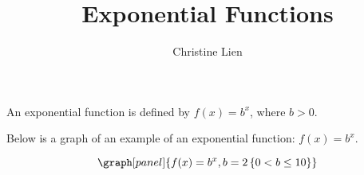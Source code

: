 \documentclass{ximera}
\title{Exponential Functions}
\author{Christine Lien}
\begin{document}


\begin{definition}
An exponential function is defined by $f(x)=b^x$, where $b>0$. 
\end{definition}

Below is a graph of an example of an exponential function: $f(x)=b^x$. 

\[\graph[panel]{f(x)=b^x, b=2 \left\{ 0 < b \leq 10 \right\}}\]
\end{document}
